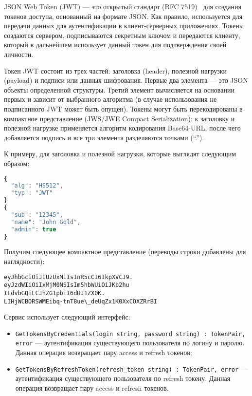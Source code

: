 JSON Web Token (JWT) — это открытый стандарт (RFC 7519)~\cite{jwt} для создания токенов доступа, основанный на формате JSON. Как правило, используется для передачи данных для аутентификации в клиент-серверных приложениях. Токены создаются сервером, подписываются секретным ключом и передаются клиенту, который в дальнейшем использует данный токен для подтверждения своей личности.

Токен JWT состоит из трех частей: заголовка (header), полезной нагрузки (payload) и подписи или данных шифрования. Первые два элемента — это JSON объекты определенной структуры. Третий элемент вычисляется на основании первых и зависит от выбранного алгоритма (в случае использования не подписанного JWT может быть опущен). Токены могут быть перекодированы в компактное представление (JWS/JWE Compact Serialization): к заголовку и полезной нагрузке применяется алгоритм кодирования Base64-URL, после чего добавляется подпись и все три элемента разделяются точками (``.'').

К примеру, для заголовка и полезной нагрузки, которые выглядят следующим образом:

\begin{lstlisting}[language=javascript]
{
  "alg": "HS512",
  "typ": "JWT"
}
{
  "sub": "12345",
  "name": "John Gold",
  "admin": true
}
\end{lstlisting}

Получим следующее компактное представление (переводы строки добавлены для наглядности):

\begin{lstlisting}
eyJhbGciOiJIUzUxMiIsInR5cCI6IkpXVCJ9.
eyJzdWIiOiIxMjM0NSIsIm5hbWUiOiJKb2hu
IEdvbGQiLCJhZG1pbiI6dHJ1ZX0K.
LIHjWCBORSWMEibq-tnT8ue\_deUqZx1K0XxCOXZRrBI
\end{lstlisting}

Сервис использует следующий интерфейс:

\begin{itemize}
    \item \lstinline{GetTokensByCredentials(login string, password string) : TokenPair, error} — аутентификация существующего пользователя по логину и паролю. Данная операция возвращает пару access и refresh токенов;
    \item \lstinline{GetTokensByRefreshToken(refresh_token string) : TokenPair, error} — ау\-тентификация существующего пользователя по refresh токену. Данная операция возвращает пару access и refresh токенов.
\end{itemize}


